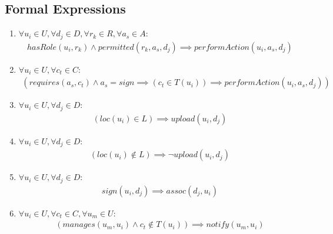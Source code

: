 \documentclass[12pt]{article}
\begin{document}
\subsection{Formal Expressions}
\begin{enumerate}
  \item \(\forall u_i \in U, \forall d_j \in D, \forall r_k \in R, \forall a_s
    \in A: \)
    \begin{align*}
      hasRole(u_i, r_k) \land permitted(r_k, a_s, d_j) \implies performAction(u_i, a_s, d_j)
    \end{align*}
  \item \(\forall u_i \in U, \forall c_t \in C:\)
    \begin{align*}
      (requires(a_s, c_t) \land a_s = sign \implies (c_t \in T(u_i)) \implies
      performAction(u_i, a_s, d_j))
    \end{align*}
  \item \(\forall u_i \in U, \forall d_j \in D:\)
    \begin{align*}
      (loc(u_i) \in L) \implies upload(u_i, d_j)
    \end{align*}
  \item \(\forall u_i \in U, \forall d_j \in D:\)
    \begin{align*}
      (loc(u_i) \notin L) \implies \lnot upload(u_i, d_j)
    \end{align*}
  \item \(\forall u_i \in U, \forall d_j \in D:\)
    \begin{align*}
      sign(u_i, d_j) \implies assoc(d_j, u_i)
    \end{align*}
  \item \(\forall u_i \in U, \forall c_t \in C, \forall u_m \in U:\)
    \begin{align*}
      (manages(u_m, u_i) \land c_t \notin T(u_i)) \implies notify(u_m, u_i)
    \end{align*}
\end{enumerate}
\end{document}
